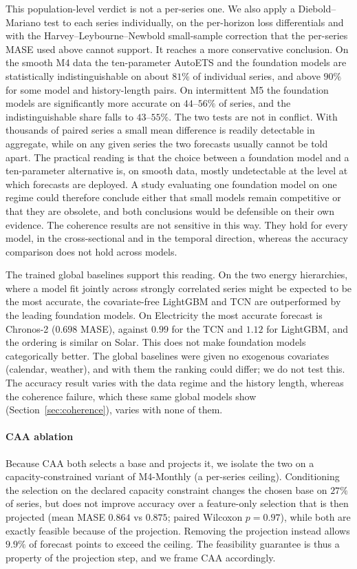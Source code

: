 \documentclass[review,number]{elsarticle}
\begin{document}
This population-level verdict is not a per-series one. We also apply a
Diebold--Mariano test to each series individually, on the per-horizon loss differentials
and with the Harvey--Leybourne--Newbold small-sample correction that the per-series MASE
used above cannot support. It reaches a more conservative conclusion. On the smooth M4 data the ten-parameter AutoETS and the foundation models
are statistically indistinguishable on about $81\%$ of individual series, and above
$90\%$ for some model and history-length pairs. On intermittent M5 the foundation models are
significantly more accurate on $44$--$56\%$ of series, and the indistinguishable share
falls to $43$--$55\%$. The two
tests are not in conflict. With thousands of paired series a small mean difference is
readily detectable in aggregate, while on any given series the two forecasts
usually cannot be told apart. The practical reading is that the choice between a
foundation model and a ten-parameter alternative is, on smooth data, mostly
undetectable at the level at which forecasts are deployed. A study
evaluating one foundation model on one regime could therefore conclude either that
small models remain competitive or that they are obsolete, and both conclusions would
be defensible on their own evidence. The coherence results are not sensitive in this way. They hold
for every model, in the cross-sectional and in the temporal direction, whereas the
accuracy comparison does not hold across models.

The trained global baselines support this reading. On the two
energy hierarchies, where a model fit jointly across strongly correlated series might be
expected to be the most accurate, the covariate-free LightGBM and TCN are outperformed by the
leading foundation models. On Electricity the most accurate forecast is Chronos-2
($0.698$ MASE), against $0.99$ for the TCN and $1.12$ for LightGBM, and the ordering is
similar on Solar. This does not make foundation models categorically better. The
global baselines were given no exogenous covariates (calendar, weather), and with them
the ranking could differ; we do not test this. The accuracy result varies with the
data regime and the history length, whereas the coherence
failure, which these same global models show
(Section~\ref{sec:coherence}), varies with none of them.

\paragraph{CAA ablation}
Because CAA both selects a base and projects it, we isolate the two on a
capacity-constrained variant of M4-Monthly (a per-series ceiling). Conditioning the
selection on the declared capacity constraint changes the chosen base on $27\%$ of
series, but does not improve accuracy over a feature-only selection that is then
projected (mean MASE $0.864$ vs $0.875$; paired Wilcoxon $p=0.97$), while both are
exactly feasible because of the projection. Removing the projection instead allows
$9.9\%$ of forecast points to exceed the ceiling. The feasibility guarantee is thus a
property of the projection step, and we frame CAA accordingly.
\end{document}
